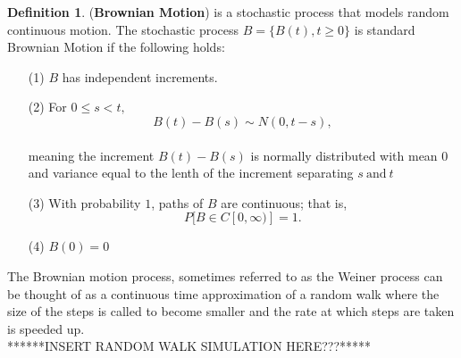 \documentclass[12pt,letterpaper]{amsart}
\theoremstyle{plain}
\theoremstyle{definition}
\newtheorem{definition}[theorem]{Definition}
\numberwithin{equation}{section}
\begin{document}
\begin{definition}(\textbf{Brownian Motion}) is a stochastic process that models random continuous motion. The stochastic process $B=\{B(t), t\geq 0\}$ is standard Brownian Motion if the following holds:
\begin{enumerate}
\item[(1)]
$B$ has independent increments.
\item[(2)]
For $0 \leq s < t,$ $$B(t)-B(s) \sim N(0,t-s),$$\\
meaning the increment $B(t)-B(s)$ is normally distributed with mean $0$ and variance equal to the lenth of the increment separating $s \ \text{and} \ t$
\item[(3)] With probability $1$, paths of $B$ are continuous; that is, $$P[B \in C[0, \infty)]=1.$$
\item[(4)] $B(0)=0$ 
\end{enumerate}
\end{definition}

The Brownian motion process, sometimes referred to as the Weiner process can be thought of as a continuous time approximation of a random walk where the size of the steps is called to become smaller and the rate at which steps are taken is speeded up. \\


******INSERT RANDOM WALK SIMULATION HERE???*****
\end{document}
